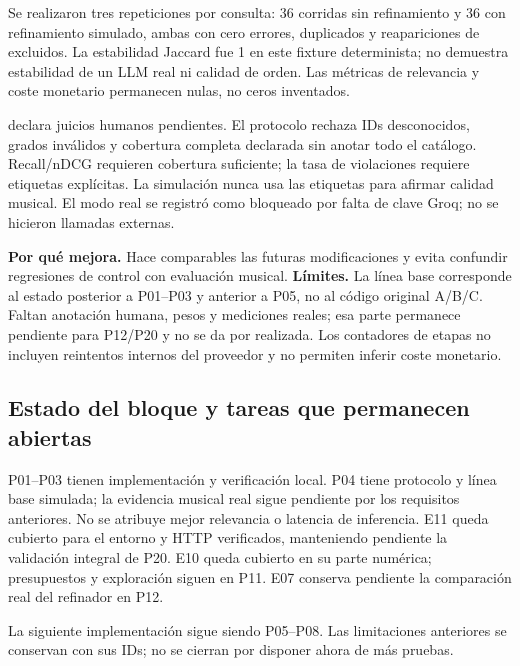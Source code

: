 Se realizaron tres repeticiones por consulta: 36 corridas sin refinamiento y
36 con refinamiento simulado, ambas con cero errores, duplicados y reapariciones
de excluidos. La estabilidad Jaccard fue 1 en este fixture determinista; no
demuestra estabilidad de un LLM real ni calidad de orden. Las métricas de
relevancia y coste monetario permanecen nulas, no ceros inventados.

 declara juicios humanos pendientes. El protocolo rechaza IDs
desconocidos, grados inválidos y cobertura completa declarada sin anotar todo
el catálogo. Recall/nDCG requieren cobertura suficiente; la tasa de violaciones
requiere etiquetas explícitas. La simulación nunca usa las etiquetas para
afirmar calidad musical. El modo real se registró como bloqueado por falta
de clave Groq; no se hicieron llamadas externas.

\textbf{Por qué mejora.} Hace comparables las futuras modificaciones y evita
confundir regresiones de control con evaluación musical. \textbf{Límites.}
La línea base corresponde al estado posterior a P01--P03 y anterior a P05,
no al código original A/B/C. Faltan anotación humana, pesos y mediciones reales;
esa parte permanece pendiente para P12/P20 y no se da por realizada.
Los contadores de etapas no incluyen reintentos internos del proveedor y no
permiten inferir coste monetario.

\subsection{Estado del bloque y tareas que permanecen abiertas}
P01--P03 tienen implementación y verificación local. P04 tiene protocolo y
línea base simulada; la evidencia musical real sigue pendiente por los
requisitos anteriores. No se atribuye mejor relevancia o latencia de inferencia.
E11 queda cubierto para el entorno y HTTP verificados, manteniendo pendiente
la validación integral de P20. E10 queda cubierto en su parte numérica;
presupuestos y exploración siguen en P11. E07 conserva pendiente la comparación
real del refinador en P12.

La siguiente implementación sigue siendo P05--P08. Las limitaciones anteriores
se conservan con sus IDs; no se cierran por disponer ahora de más pruebas.
